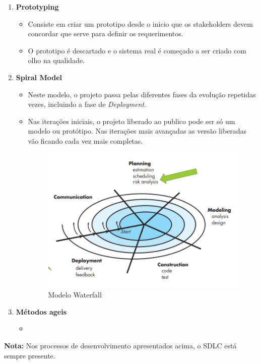 \documentclass[a4paper, 12pt, onecolumn, oneside]{scrartcl}
\begin{document}
\begin{enumerate}
  \item \textbf{Prototyping}
  \begin{itemize}
    \item Consiste em criar um prototipo desde o inicio que os stakeholders devem concordar que serve para definir os requerimentos.
    \item O prototipo é descartado e o sistema real é começado a ser criado com olho na qualidade. 
  \end{itemize}
  \item \textbf{Spiral Model}
  \begin{itemize}
    \item Neste modelo, o projeto passa pelas diferentes fases da evolução repetidas vezes, incluindo a fase de \textit{Deployment}.
    \item Nas iterações iniciais, o projeto liberado ao publico pode ser só um modelo ou protótipo. Nas iterações mais avançadas as versão liberadas 
    vão ficando cada vez mais completas.
    \begin{figure}[H]
      \centering
      \includegraphics[width=1\textwidth]{modelo-modo-espiral.png}
      \caption{Modelo Waterfall}\label{fig1}
    \end{figure}
  \end{itemize}
  \item \textbf{Métodos ageis}
  \begin{itemize}
    \item
  \end{itemize}
\end{enumerate}
\textbf{Nota:} Nos processos de desenvolvimento apresentados acima, o SDLC está sempre presente.
\end{document}
